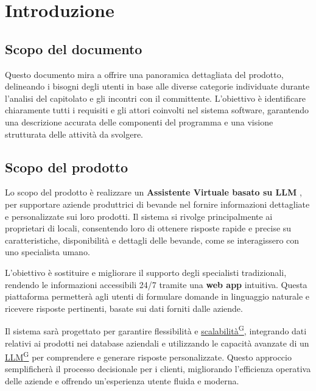 \section{Introduzione}

\subsection{Scopo del documento}
Questo documento mira a offrire una panoramica dettagliata del prodotto, 
delineando i bisogni degli utenti in base alle diverse categorie individuate durante 
l'analisi del capitolato e gli incontri con il committente.
L'obiettivo è identificare chiaramente tutti i requisiti e gli attori coinvolti
nel sistema software, garantendo una descrizione accurata delle componenti del programma
e una visione strutturata delle attività da svolgere. 

\subsection{Scopo del prodotto}
Lo scopo del prodotto è realizzare un \textbf{Assistente Virtuale basato su LLM }, 
per supportare aziende produttrici di bevande nel fornire 
informazioni dettagliate e personalizzate sui loro prodotti. 
Il sistema si rivolge principalmente ai proprietari di locali, 
consentendo loro di ottenere risposte rapide e precise su caratteristiche, 
disponibilità e dettagli delle bevande, come se interagissero con uno specialista umano.

L’obiettivo è sostituire e migliorare il supporto degli specialisti tradizionali, 
rendendo le informazioni accessibili 24/7 tramite una \textbf{web app} intuitiva. 
Questa piattaforma permetterà agli utenti di formulare domande in linguaggio naturale 
e ricevere risposte pertinenti, basate sui dati forniti dalle aziende. 

Il sistema sarà progettato per garantire flessibilità e \href{https://code7crusaders.github.io/docs/PB/documentazione_interna/glossario.html#scalabilità}{scalabilità\textsuperscript{G}}, 
integrando dati relativi ai prodotti nei database aziendali e utilizzando 
le capacità avanzate di un \href{https://code7crusaders.github.io/docs/PB/documentazione_interna/glossario.html#llm-large-language-model}{LLM\textsuperscript{G}} per comprendere e generare risposte personalizzate. 
Questo approccio semplificherà il processo decisionale per i clienti, 
migliorando l’efficienza operativa delle aziende e offrendo 
un’esperienza utente fluida e moderna.

